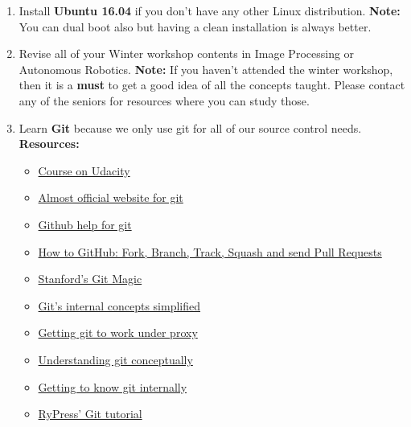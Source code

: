 \documentclass{article}
\begin{document}
\begin{enumerate}%

\item Install {\bf Ubuntu 16.04} if you don't have any other Linux distribution.
{\newline}{\newline}
{\bf Note:} You can dual boot also but having a clean installation is always better.

\item Revise all of your Winter workshop contents in Image Processing or Autonomous Robotics.
{\newline}{\newline}
{\bf Note:} If you haven't attended the winter workshop, then it is a {\bf must} to get a good idea of all the concepts taught. Please contact any of the seniors for resources where you can study those.

\item Learn {\bf Git} because we only use git for all of our source control needs.{\newline}{\newline}
{\bf Resources:}
    \begin{itemize}
        \item \href{https://www.udacity.com/course/how-to-use-git-and-github--ud775}{Course on Udacity}
        \item \href{https://git-scm.com/}{Almost official website for git}
        \item \href{https://help.github.com/articles/good-resources-for-learning-git-and-github/}{Github help for git}
        \item \href{https://gun.io/blog/how-to-github-fork-branch-and-pull-request/www-cs-students.stanford.edu/~blynn/gitmagic/ch08.html}{How to GitHub: Fork, Branch, Track, Squash and send Pull Requests}
        \item \href{http://www-cs-students.stanford.edu/~blynn/gitmagic/ch08.html}{Stanford's Git Magic}
        \item \href{http://gitolite.com/gcs.html}{Git's internal concepts simplified}
        \item \href{http://stackoverflow.com/questions/783811/getting-git-to-work-with-a-proxy-server}{Getting git to work under proxy}
        \item \href{https://www.sbf5.com/~cduan/technical/git/}{Understanding git conceptually}
        \item \href{http://stackoverflow.com/questions/261557/what-do-i-need-to-read-to-understand-how-git-works}{Getting to know git internally}
        \item \href{http://rypress.com/tutorials/git/index}{RyPress' Git tutorial}
    \end{itemize}


\end{enumerate}
\end{document}
